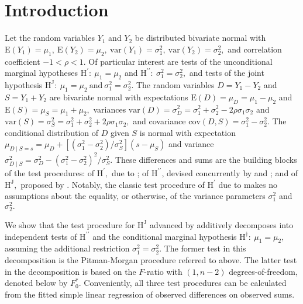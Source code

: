 \section{Introduction}  
Let the random variables $Y_1$ and $Y_2$ be distributed bivariate normal with $\mathrm{E}(Y_1)=\mu_1,\ \mathrm{E}(Y_2)=\mu_2,\ \mathrm{var}(Y_1)=\sigma^2_1,\ \mathrm{var}(Y_2)=\sigma^2_2,$ and correlation coefficient $-1<\rho<1.$ Of particular interest are tests of the unconditional marginal hypotheses $\textrm{H}^\prime\colon~\mu_1 = \mu_2$ and $\textrm{H}^{\prime\prime}\colon~\sigma^2_1 = \sigma^2_2,$ and tests of the joint hypothesis $\textrm{H}^\mathrm{J}\colon~\mu_1 = \mu_2\ \textrm{and}\ \sigma^2_1 = \sigma^2_2.$ The random variables $D=Y_1-Y_2$ and $S=Y_1+Y_2$ are bivariate normal with expectations $\mathrm{E}(D) = \mu_D = \mu_1- \mu_2$ and $\mathrm{E}(S) = \mu_S = \mu_1+ \mu_2,$ variances $\mathrm{var}(D) = \sigma^2_D = \sigma_1^2 + \sigma_2^2 - 2 \rho \sigma_1 \sigma_2$ and $\mathrm{var}(S) = \sigma^2_S = \sigma_1^2 + \sigma_2^2 + 2 \rho \sigma_1 \sigma_2,$ and covariance $\mathrm{cov}(D,S) = \sigma_1^2 - \sigma_2^2.$ The conditional distribution of $D$ given $S$ is normal with expectation $\mu_{D\mid S=s} = \mu_D + [ ( \sigma^2_1 - \sigma^2_2 ) / \sigma^2_S ] ( s - \mu_S )$ and variance $\sigma^2_{D\mid S} = \sigma^2_D - ( \sigma^2_1 - \sigma^2_2 )^2 / \sigma^2_S.$ These differences and sums are the building blocks of the test procedures: of $\textrm{H}^\prime,$ due to \cite{Student}; of $\textrm{H}^{\prime\prime}$, devised concurrently by \cite{Pit39} and \cite{Morgan39}; and of $\textrm{H}^\mathrm{J},$ proposed by \citet{BradBlack89}. Notably, the classic test procedure of $\textrm{H}^\prime$ due to \cite{Student} makes no assumptions about the equality, or otherwise, of the variance parameters $\sigma^2_1$ and $\sigma^2_2.$


We show that the test procedure for $\textrm{H}^\mathrm{J}$ advanced by \citet{BradBlack89} additively decomposes into independent tests of $\textrm{H}^{\prime\prime}$ and the conditional marginal hypothesis $\textrm{H}^\dag\colon~\mu_1 = \mu_2,$ assuming the additional restriction $\sigma^2_1 = \sigma^2_2.$  The former test in this decomposition is the Pitman-Morgan procedure referred to above. The latter test in the decomposition is based on the $F$-ratio with $(1,n-2)$ degrees-of-freedom, denoted below by $F_0^\ast.$ Conveniently, all three test procedures can be calculated from the fitted simple linear regression of observed differences on observed sums. 



